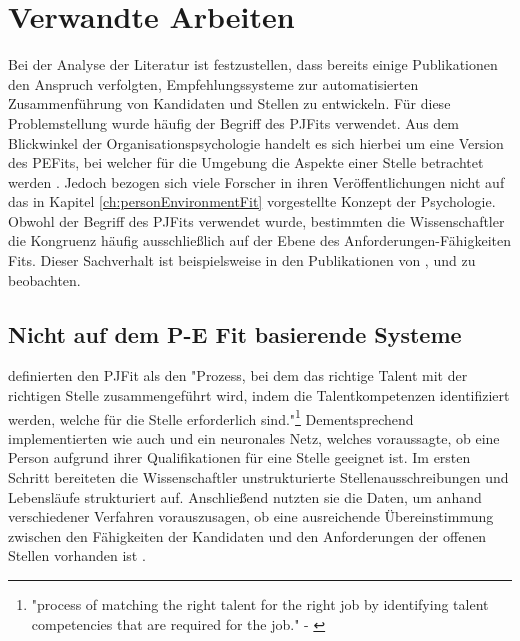 \chapter{Verwandte Arbeiten}
\label{ch:verwandteArbeiten}
Bei der Analyse der Literatur ist festzustellen, dass bereits einige Publikationen den Anspruch verfolgten, Empfehlungssysteme zur automatisierten Zusammenführung von Kandidaten und Stellen zu entwickeln. Für diese Problemstellung wurde häufig der Begriff des \acp{PJFit} verwendet. Aus dem Blickwinkel der Organisationspsychologie handelt es sich hierbei um eine Version des \acp{PEFit}, bei welcher für die Umgebung die Aspekte einer Stelle betrachtet werden \cite[S. 1ff.]{edwards:1991}\cite[S. 3]{malinowski:2006}. Jedoch bezogen sich viele Forscher in ihren Veröffentlichungen nicht auf das in Kapitel \ref{ch:personEnvironmentFit} vorgestellte Konzept der Psychologie. Obwohl der Begriff des \acp{PJFit} verwendet wurde, bestimmten die Wissenschaftler die Kongruenz häufig ausschließlich auf der Ebene des Anforderungen-Fähigkeiten Fits. Dieser Sachverhalt ist beispielsweise in den Publikationen von \textcite[S. 1ff.]{luo:2019}, \textcite[S. 1ff.]{qin:2018} und \textcite[S. 1ff.]{personJobFit:2018} zu beobachten.

\section{Nicht auf dem P-E Fit basierende Systeme}
\label{ch:verwandteArbeiten:nichtAufDemPEFitBasierend}
\textcite[S. 1, Z. 1f.]{personJobFit:2018} definierten den \ac{PJFit} als den "Prozess, bei dem das richtige Talent mit der richtigen Stelle zusammengeführt wird, indem die Talentkompetenzen identifiziert werden, welche für die Stelle erforderlich sind."\footnote{"process of matching the right talent for the right job by identifying talent competencies that are required for the job." - \textcite[S. 1, Z. 1f.]{personJobFit:2018}} Dementsprechend implementierten \textcite[S. 1ff.]{personJobFit:2018} wie auch \textcite[S. 1ff.]{luo:2019} und \textcite[S. 1ff.]{qin:2018} ein neuronales Netz, welches voraussagte, ob eine Person aufgrund ihrer Qualifikationen für eine Stelle geeignet ist. Im ersten Schritt bereiteten die Wissenschaftler unstrukturierte Stellenausschreibungen und Lebensläufe strukturiert auf. Anschließend nutzten sie die Daten, um anhand verschiedener Verfahren vorauszusagen, ob eine ausreichende Übereinstimmung zwischen den Fähigkeiten der Kandidaten und den Anforderungen der offenen Stellen vorhanden ist \cite[S. 1ff.]{luo:2019}\cite[S. 1ff.]{qin:2018}\cite[S. 1ff.]{personJobFit:2018}.

